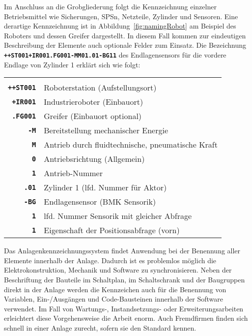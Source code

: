 Im Anschluss an die Grobgliederung folgt die Kennzeichnung einzelner Betriebsmittel wie Sicherungen, SPSn, Netzteile, Zylinder und Sensoren. Eine derartige Kennzeichnung ist in Abbildung~\ref{fig:namingRobot} am Beispiel des Roboters und dessen Greifer dargestellt. In diesem Fall kommen zur eindeutigen Beschreibung der Elemente auch optionale Felder zum Einsatz. Die Bezeichnung \texttt{\textbf{++ST001+IR001.FG001-MM01.01-BG11}} des Endlagensensors für die vordere Endlage von Zylinder 1 erklärt sich wie folgt:


\begin{tabularx}{0.92\textwidth}{rX}
  & \\
  \textbf{\texttt{++ST001}} & Roboterstation (Aufstellungsort)\\
  \textbf{\texttt{+IR001}} & Industrieroboter (Einbauort)\\
  \textbf{\texttt{.FG001}} & Greifer (Einbauort optional)\\
  \textbf{\texttt{-M}} & Bereitstellung mechanischer Energie\\
  \textbf{\texttt{M}} & Antrieb durch fluidtechnische, pneumatische Kraft\\
  \textbf{\texttt{0}} & Antriebsrichtung (Allgemein)\\
  \textbf{\texttt{1}} & Antrieb-Nummer\\
  \textbf{\texttt{.01}} & Zylinder 1 (lfd. Nummer für Aktor)\\
  \textbf{\texttt{-BG}} & Endlagensensor (BMK Sensorik)\\
  \textbf{\texttt{1}} & lfd. Nummer Sensorik mit gleicher Abfrage\\
  \textbf{\texttt{1}} & Eigenschaft der Positionsabfrage (vorn)
\end{tabularx}

\leer Das Anlagenkennzeichnungssystem findet Anwendung bei der Benennung aller Elemente innerhalb der Anlage. Dadurch ist es problemlos möglich die Elektrokonstruktion, Mechanik und Software zu synchronisieren. Neben der Beschriftung der Bauteile im Schaltplan, im Schaltschrank und der Baugruppen direkt in der Anlage werden die Kennzeichen auch für die Benennung von Variablen, Ein-/Ausgängen und Code-Bausteinen innerhalb der Software verwendet. Im Fall von Wartungs-, Instandsetzungs- oder Erweiterungsarbeiten erleichtert diese Vorgehensweise die Arbeit enorm. Auch Fremdfirmen finden sich schnell in einer Anlage zurecht, sofern sie den Standard kennen.